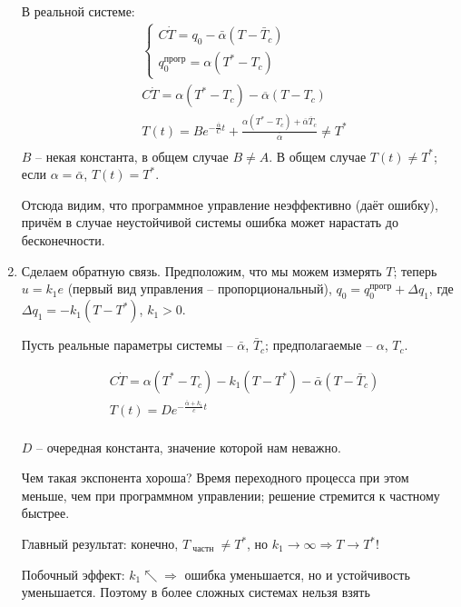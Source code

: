 \documentclass[main.tex]{subfiles}
\begin{document}
\begin{enumerate}
    В реальной системе:
    \begin{align*}
        & \begin{cases}
            C \dot T = q_0 - \bar \alpha (T - \bar T_c) \\
            q_0^{\text{прогр}} = \alpha (T^* - T_c)
        \end{cases}
         \\
         & C\dot T = \alpha (T^* - T_c) - \overline{\alpha}(T - T_c) \\
         & T(t) = Be^{- \frac{\overline{\alpha}}{C}t} + \frac{\alpha(T^* - T_c) + \overline{\alpha} \overline{T}_c}{\overline{\alpha}} \ne T^* \\
    \end{align*}
    $B$ -- некая константа, в общем случае $ B \ne A $.
    В общем случае $ T(t) \ne T^* $; если $ \alpha = \bar \alpha $, $ T(t) = T^* $.

	Отсюда видим, что программное управление неэффективно (даёт ошибку), причём в случае неустойчивой системы ошибка может нарастать до бесконечности.

	\item Сделаем обратную связь. Предположим, что мы можем измерять $ T $; теперь $ u = k_1 e $ (первый вид управления -- пропорциональный), $ q_0 = q_0^{\text{прогр}} + \Delta q_1 $, где $ \Delta q_1 = - k_1 (T - T^*) $, $ k_1 > 0 $.

    Пусть реальные параметры системы -- $ \bar \alpha $, $ \bar T_c $; предполагаемые -- $ \alpha $, $ T_c $.

    \begin{align*}
        & C \dot T = \alpha (T^* - T_c) - k_1 (T - T^*) - \bar \alpha(T - \bar T_c) \\
        & T(t) = De^{ - \frac{\bar \alpha + k_1}{c}t} \\
    \end{align*}

    $ D $ -- очередная константа, значение которой нам неважно.

    Чем такая экспонента хороша?
    Время переходного процесса при этом меньше, чем при программном управлении; решение стремится к частному быстрее.

    Главный результат: конечно, $ T_{\text{ частн }} \ne T^* $, но $ \boxed{ k_1 \to \infty \Rightarrow T \to T^* } $!

    Побочный эффект: $k_1 \nwarrow \Rightarrow $ ошибка уменьшается, но и устойчивость уменьшается.
    Поэтому в более сложных системах нельзя взять


\end{enumerate}
\end{document}
